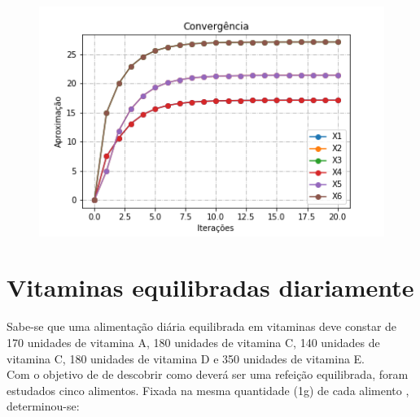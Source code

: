 \documentclass[
	12pt,				%
	openright,			%
	twoside,			%
	a4paper,			%
	english,			%
	french,				%
	spanish,			%
	brazil				%
	]{abntex2_new}
\begin{document}
\begin{alineas}
 \begin{figure}[htb]
 \includegraphics[scale=1]{grafico1.png}
 \end{figure}
 \end{alineas}





\section{Vitaminas equilibradas diariamente}
Sabe-se que uma alimentação diária equilibrada em vitaminas deve constar
de 170 unidades de vitamina A,
180 unidades de vitamina C, 140 unidades
de vitamina C, 180 unidades de vitamina D
e 350 unidades de vitamina E.\\
Com o objetivo de de descobrir como deverá
ser uma refeição equilibrada, foram
estudados cinco alimentos. Fixada na mesma quantidade (1g) de cada alimento
, determinou-se:
\end{document}
